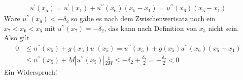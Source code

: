 \begin{solution}
\begin{enumerate}[label = (\roman*)]
\begin{align*}
		u^\prime(x_5) = u^\prime(x_1) + u^{\prime\prime}(x_6) (x_5 - x_1) = u^{\prime\prime}(x_6) (x_5 - x_1)
		\end{align*}
		Wäre $u^{\prime\prime}(x_6) < -\delta_2$ so gäbe es nach dem Zwischenwertsatz noch ein $x_7 < x_6 < x_5$ mit $u^{\prime\prime}(x_7) = -\delta_2$, das kann nach Definition von $x_5$ nicht sein. Also gilt
		\begin{align*}
		0 &\leq u^{\prime\prime}(x_5) + g(x_5) u^\prime (x_5) = u^{\prime\prime}(x_5) + g(x_5) u^{\prime\prime}(x_6)(x_5 - x_1) \\
		&\leq u^{\prime\prime}(x_5) + M |u^{\prime\prime}(x_5)| \frac{1}{2M} \leq -\delta_2 + \frac{\delta_2}{2} = -\frac{\delta_2}{2} < 0
		\end{align*}
		Ein Widerspruch!
	\end{enumerate}


\end{solution}

